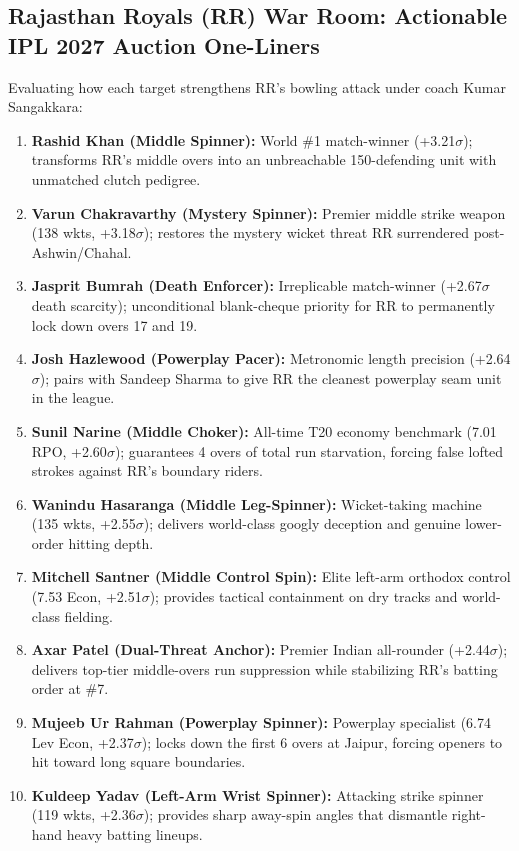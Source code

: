 \documentclass[10pt,a4paper]{article}
\begin{document}
\subsection*{Rajasthan Royals (RR) War Room: Actionable IPL 2027 Auction One-Liners}
Evaluating how each target strengthens RR's bowling attack under coach Kumar Sangakkara:
\begin{enumerate}[leftmargin=1.2em]
    \item \textbf{Rashid Khan (Middle Spinner):} World \#1 match-winner (+3.21$\sigma$); transforms RR's middle overs into an unbreachable 150-defending unit with unmatched clutch pedigree.
    \item \textbf{Varun Chakravarthy (Mystery Spinner):} Premier middle strike weapon (138 wkts, +3.18$\sigma$); restores the mystery wicket threat RR surrendered post-Ashwin/Chahal.
    \item \textbf{Jasprit Bumrah (Death Enforcer):} Irreplicable match-winner (+2.67$\sigma$ death scarcity); unconditional blank-cheque priority for RR to permanently lock down overs 17 and 19.
    \item \textbf{Josh Hazlewood (Powerplay Pacer):} Metronomic length precision (+2.64$\sigma$); pairs with Sandeep Sharma to give RR the cleanest powerplay seam unit in the league.
    \item \textbf{Sunil Narine (Middle Choker):} All-time T20 economy benchmark (7.01 RPO, +2.60$\sigma$); guarantees 4 overs of total run starvation, forcing false lofted strokes against RR's boundary riders.
    \item \textbf{Wanindu Hasaranga (Middle Leg-Spinner):} Wicket-taking machine (135 wkts, +2.55$\sigma$); delivers world-class googly deception and genuine lower-order hitting depth.
    \item \textbf{Mitchell Santner (Middle Control Spin):} Elite left-arm orthodox control (7.53 Econ, +2.51$\sigma$); provides tactical containment on dry tracks and world-class fielding.
    \item \textbf{Axar Patel (Dual-Threat Anchor):} Premier Indian all-rounder (+2.44$\sigma$); delivers top-tier middle-overs run suppression while stabilizing RR’s batting order at \#7.
    \item \textbf{Mujeeb Ur Rahman (Powerplay Spinner):} Powerplay specialist (6.74 Lev Econ, +2.37$\sigma$); locks down the first 6 overs at Jaipur, forcing openers to hit toward long square boundaries.
    \item \textbf{Kuldeep Yadav (Left-Arm Wrist Spinner):} Attacking strike spinner (119 wkts, +2.36$\sigma$); provides sharp away-spin angles that dismantle right-hand heavy batting lineups.
\end{enumerate}
\end{document}
